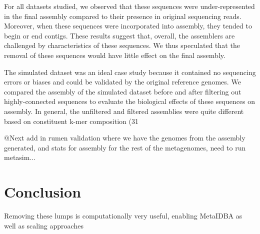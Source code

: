 \documentclass[11pt]{article} %
\begin{document}
For all datasets studied, we observed that these sequences were under-represented in the final assembly compared to their presence in original sequencing reads.  Moreover, when these sequences were incorporated into assembly, they tended to begin or end contigs.  These results suggest that, overall, the assemblers are challenged by characteristics of these sequences.  We thus speculated that the removal of these sequences would have little effect on the final assembly. 

The simulated dataset was an ideal case study because it contained no sequencing errors or biases and could be validated by the original reference genomes.  We compared the assembly of the simulated dataset before and after filtering out highly-connected sequences to evaluate the biological effects of these sequences on assembly.  In general, the unfiltered and filtered assemblies were quite different based on constituent k-mer composition (31%

@Next add in rumen validation where we have the genomes from the assembly generated, and stats for assembly for the rest of the metagenomes, need to run metasim...


\section{Conclusion}
Removing these lumps is computationally very useful, enabling MetaIDBA as well as scaling approaches



\end{document}
